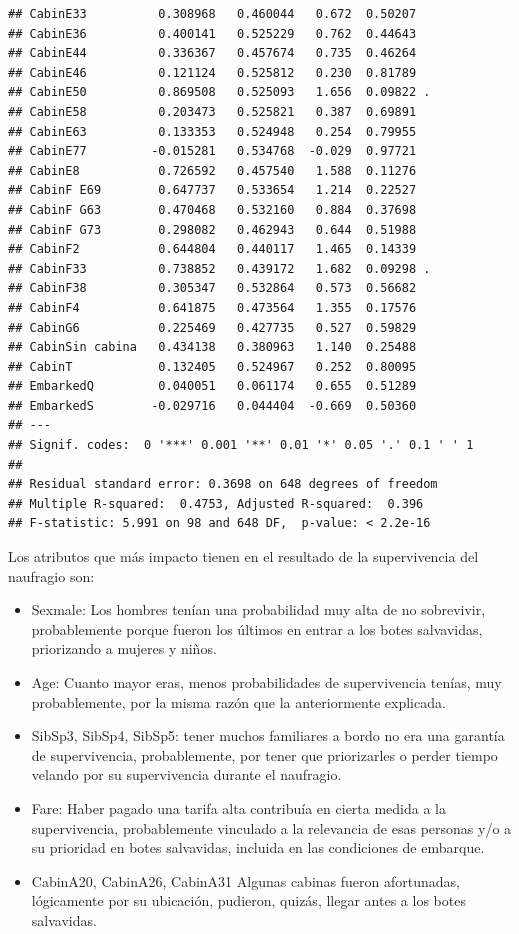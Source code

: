 \documentclass[]{article}
\begin{document}
\begin{verbatim}
## CabinE33          0.308968   0.460044   0.672  0.50207    
## CabinE36          0.400141   0.525229   0.762  0.44643    
## CabinE44          0.336367   0.457674   0.735  0.46264    
## CabinE46          0.121124   0.525812   0.230  0.81789    
## CabinE50          0.869508   0.525093   1.656  0.09822 .  
## CabinE58          0.203473   0.525821   0.387  0.69891    
## CabinE63          0.133353   0.524948   0.254  0.79955    
## CabinE77         -0.015281   0.534768  -0.029  0.97721    
## CabinE8           0.726592   0.457540   1.588  0.11276    
## CabinF E69        0.647737   0.533654   1.214  0.22527    
## CabinF G63        0.470468   0.532160   0.884  0.37698    
## CabinF G73        0.298082   0.462943   0.644  0.51988    
## CabinF2           0.644804   0.440117   1.465  0.14339    
## CabinF33          0.738852   0.439172   1.682  0.09298 .  
## CabinF38          0.305347   0.532864   0.573  0.56682    
## CabinF4           0.641875   0.473564   1.355  0.17576    
## CabinG6           0.225469   0.427735   0.527  0.59829    
## CabinSin cabina   0.434138   0.380963   1.140  0.25488    
## CabinT            0.132405   0.524967   0.252  0.80095    
## EmbarkedQ         0.040051   0.061174   0.655  0.51289    
## EmbarkedS        -0.029716   0.044404  -0.669  0.50360    
## ---
## Signif. codes:  0 '***' 0.001 '**' 0.01 '*' 0.05 '.' 0.1 ' ' 1
## 
## Residual standard error: 0.3698 on 648 degrees of freedom
## Multiple R-squared:  0.4753, Adjusted R-squared:  0.396 
## F-statistic: 5.991 on 98 and 648 DF,  p-value: < 2.2e-16
\end{verbatim}

Los atributos que más impacto tienen en el resultado de la supervivencia
del naufragio son:

\begin{itemize}
\item
  Sexmale: Los hombres tenían una probabilidad muy alta de no
  sobrevivir, probablemente porque fueron los últimos en entrar a los
  botes salvavidas, priorizando a mujeres y niños.
\item
  Age: Cuanto mayor eras, menos probabilidades de supervivencia tenías,
  muy probablemente, por la misma razón que la anteriormente explicada.
\item
  SibSp3, SibSp4, SibSp5: tener muchos familiares a bordo no era una
  garantía de supervivencia, probablemente, por tener que priorizarles o
  perder tiempo velando por su supervivencia durante el naufragio.
\item
  Fare: Haber pagado una tarifa alta contribuía en cierta medida a la
  supervivencia, probablemente vinculado a la relevancia de esas
  personas y/o a su prioridad en botes salvavidas, incluida en las
  condiciones de embarque.
\item
  CabinA20, CabinA26, CabinA31 Algunas cabinas fueron afortunadas,
  lógicamente por su ubicación, pudieron, quizás, llegar antes a los
  botes salvavidas.
\end{itemize}
\end{document}
